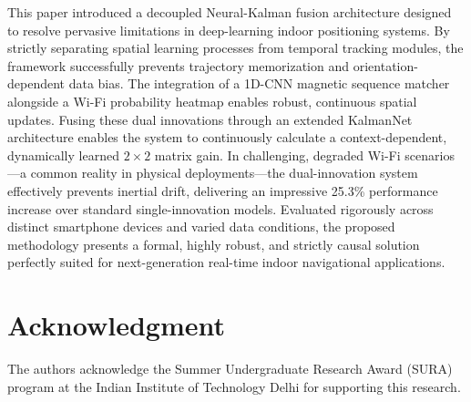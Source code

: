\documentclass[conference]{IEEEtran}
\begin{document}
This paper introduced a decoupled Neural-Kalman fusion architecture designed to resolve pervasive limitations in deep-learning indoor positioning systems. By strictly separating spatial learning processes from temporal tracking modules, the framework successfully prevents trajectory memorization and orientation-dependent data bias. The integration of a 1D-CNN magnetic sequence matcher alongside a Wi-Fi probability heatmap enables robust, continuous spatial updates. Fusing these dual innovations through an extended KalmanNet architecture enables the system to continuously calculate a context-dependent, dynamically learned $2\!\times\!2$ matrix gain. In challenging, degraded Wi-Fi scenarios—a common reality in physical deployments—the dual-innovation system effectively prevents inertial drift, delivering an impressive 25.3\% performance increase over standard single-innovation models. Evaluated rigorously across distinct smartphone devices and varied data conditions, the proposed methodology presents a formal, highly robust, and strictly causal solution perfectly suited for next-generation real-time indoor navigational applications.

\section*{Acknowledgment}
The authors acknowledge the Summer Undergraduate Research Award (SURA) program at the Indian Institute of Technology Delhi for supporting this research.



\end{document}
